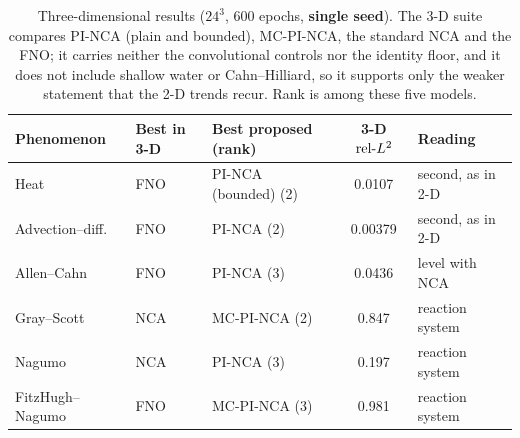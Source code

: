 \begin{table}[t]
\centering
\caption{Three-dimensional results ($24^3$, 600 epochs, \textbf{single seed}). The 3-D
suite compares PI-NCA (plain and bounded), MC-PI-NCA, the standard NCA and the FNO; it
carries neither the convolutional controls nor the identity floor, and it does not
include shallow water or Cahn--Hilliard, so it supports only the weaker statement that the
2-D trends recur. Rank is among these five models.}
\label{tab:regime3d}
\small
\begin{tabularx}{\linewidth}{@{}lllcX@{}}
\toprule
Phenomenon & Best in 3-D & Best proposed (rank) & 3-D $\mathrm{rel}\mbox{-}L^2$ & Reading \\
\midrule
Heat             & FNO & PI-NCA (bounded) (2) & 0.0107  & second, as in 2-D \\
Advection--diff. & FNO & PI-NCA (2)           & 0.00379 & second, as in 2-D \\
Allen--Cahn      & FNO & PI-NCA (3)           & 0.0436  & level with NCA \\
Gray--Scott      & NCA & MC-PI-NCA (2)        & 0.847   & reaction system \\
Nagumo           & NCA & PI-NCA (3)           & 0.197   & reaction system \\
FitzHugh--Nagumo & FNO & MC-PI-NCA (3)        & 0.981   & reaction system \\
\bottomrule
\end{tabularx}
\end{table}
